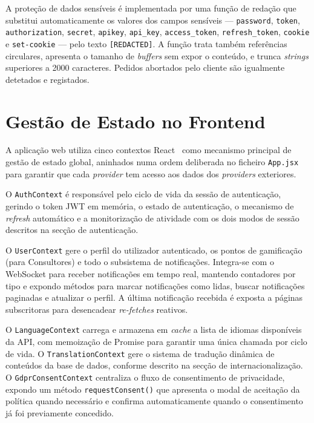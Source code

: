 \documentclass[12pt,a4paper]{report}
\begin{document}
A proteção de dados sensíveis é implementada por uma função de redação que substitui automaticamente os valores dos campos sensíveis --- \texttt{password}, \texttt{token}, \texttt{authorization}, \texttt{secret}, \texttt{apikey}, \texttt{api\_key}, \texttt{access\_token}, \texttt{refresh\_token}, \texttt{cookie} e \texttt{set-cookie} --- pelo texto \texttt{[REDACTED]}. A função trata também referências circulares, apresenta o tamanho de \textit{buffers} sem expor o conteúdo, e trunca \textit{strings} superiores a 2000 caracteres. Pedidos abortados pelo cliente são igualmente detetados e registados.

\section{Gestão de Estado no Frontend}

A aplicação web utiliza cinco contextos React~\cite{react} como mecanismo principal de gestão de estado global, aninhados numa ordem deliberada no ficheiro \texttt{App.jsx} para garantir que cada \textit{provider} tem acesso aos dados dos \textit{providers} exteriores.

O \texttt{AuthContext} é responsável pelo ciclo de vida da sessão de autenticação, gerindo o token JWT em memória, o estado de autenticação, o mecanismo de \textit{refresh} automático e a monitorização de atividade com os dois modos de sessão descritos na secção de autenticação.

O \texttt{UserContext} gere o perfil do utilizador autenticado, os pontos de gamificação (para Consultores) e todo o subsistema de notificações. Integra-se com o WebSocket para receber notificações em tempo real, mantendo contadores por tipo e expondo métodos para marcar notificações como lidas, buscar notificações paginadas e atualizar o perfil. A última notificação recebida é exposta a páginas subscritoras para desencadear \textit{re-fetches} reativos.

O \texttt{LanguageContext} carrega e armazena em \textit{cache} a lista de idiomas disponíveis da API, com memoização de Promise para garantir uma única chamada por ciclo de vida. O \texttt{TranslationContext} gere o sistema de tradução dinâmica de conteúdos da base de dados, conforme descrito na secção de internacionalização. O \texttt{GdprConsentContext} centraliza o fluxo de consentimento de privacidade, expondo um método \texttt{requestConsent()} que apresenta o modal de aceitação da política quando necessário e confirma automaticamente quando o consentimento já foi previamente concedido.
\end{document}
